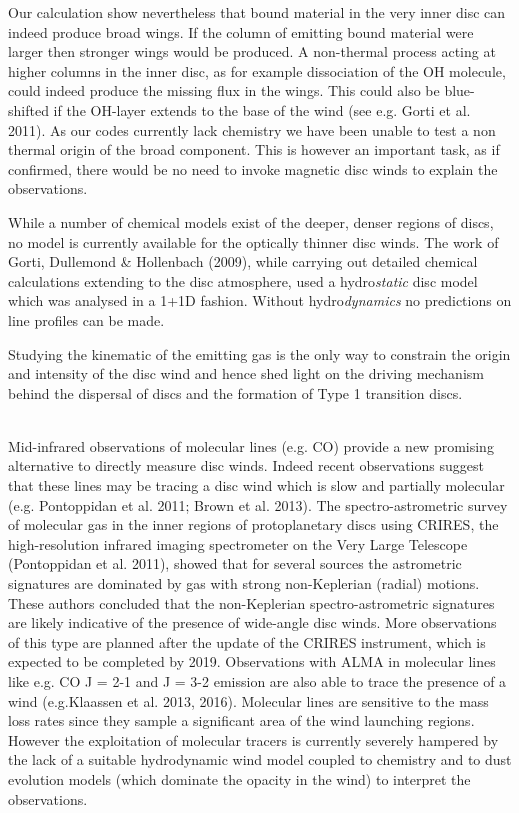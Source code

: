 \documentclass[10pt,fleqn,twoside]{article}
\newcommand{\Tcol}{\color{blue}}
\begin{document}
Our calculation show nevertheless that bound material in the very
inner disc can indeed produce broad wings. If the column of emitting
bound material were larger then stronger wings would be produced. A
non-thermal process acting at higher columns in the inner disc, as for
example dissociation of the OH molecule, could
indeed produce the missing flux in the wings. This could also be
blue-shifted if the OH-layer extends to the base of the wind (see e.g.
Gorti et al. 2011). As our codes currently
lack chemistry we have been unable to test a non thermal
origin of the broad component. This is however an important task, as
if confirmed, there would be no need to invoke magnetic disc winds to
explain the observations.  

 While a number of chemical models exist
of the deeper, denser regions of discs, no model is currently
available for the optically thinner disc winds. The work of Gorti, Dullemond \&
Hollenbach (2009), while carrying out detailed chemical calculations
extending to the disc atmosphere, used a hydro{\it static} disc model which
was analysed in a 1+1D fashion. Without hydro{\it dynamics} no predictions
on line profiles can be made.  

Studying the kinematic of the emitting gas is the only way to
constrain the origin and intensity of the disc wind and hence shed
light on the driving mechanism behind the dispersal of discs and the
formation of Type 1 transition discs. 

\vspace{0.5em}{\Tcol\bf Molecular species}\\
Mid-infrared observations of molecular lines (e.g. CO) provide a new
promising alternative to directly measure disc winds. Indeed recent
observations suggest that these lines may be tracing a disc wind which
is slow and partially molecular (e.g. Pontoppidan et al. 2011; Brown et al. 2013). 
The spectro-astrometric survey of molecular gas in the inner regions of
protoplanetary discs using CRIRES, the high-resolution infrared
imaging spectrometer on the Very Large Telescope (Pontoppidan et
al. 2011), showed that for several sources the astrometric signatures
are dominated by gas with strong non-Keplerian (radial) motions. These
authors concluded that the non-Keplerian spectro-astrometric
signatures are likely indicative of the presence of wide-angle disc
winds. 
More observations of this type are planned after the update of
the CRIRES instrument, which is expected to be completed by
2019. Observations with ALMA in molecular lines like e.g. CO J = 2-1
and J = 3-2 emission are also able to trace the presence of a wind (e.g.Klaassen et al. 2013, 2016).  
Molecular lines are sensitive to the mass loss rates since they
sample a significant area of the wind launching regions. However the
exploitation of molecular tracers is currently severely hampered by
the lack of a suitable hydrodynamic wind model coupled to chemistry
and to dust evolution models (which dominate the opacity in the wind)
to interpret the observations.
\end{document}
